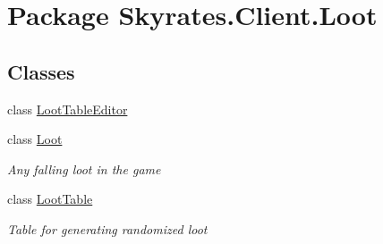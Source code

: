 \hypertarget{namespace_skyrates_1_1_client_1_1_loot}{\section{Package Skyrates.\-Client.\-Loot}
\label{namespace_skyrates_1_1_client_1_1_loot}
}
\subsection*{Classes}
\begin{DoxyCompactItemize}
\item 
class \hyperlink{class_skyrates_1_1_client_1_1_loot_1_1_loot_table_editor}{Loot\-Table\-Editor}
\item 
class \hyperlink{class_skyrates_1_1_client_1_1_loot_1_1_loot}{Loot}
\begin{DoxyCompactList}\small\item\em Any falling loot in the game \end{DoxyCompactList}\item 
class \hyperlink{class_skyrates_1_1_client_1_1_loot_1_1_loot_table}{Loot\-Table}
\begin{DoxyCompactList}\small\item\em Table for generating randomized loot \end{DoxyCompactList}\end{DoxyCompactItemize}
